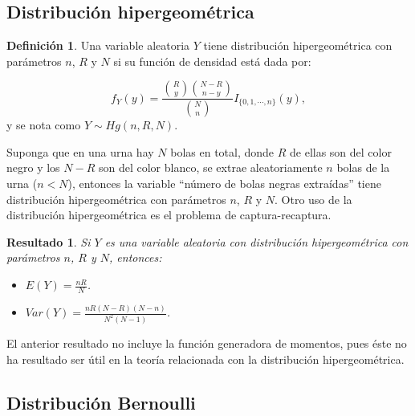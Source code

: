 \documentclass[
  spanish,
]{book}
\providecommand{\tightlist}{%
  \setlength{\itemsep}{0pt}\setlength{\parskip}{0pt}}
\newtheorem{proposition}{Resultado}[chapter]
\theoremstyle{definition}
\newtheorem{definition}{Definición}[chapter]
\theoremstyle{definition}
\theoremstyle{definition}
\theoremstyle{definition}
\theoremstyle{remark}
\begin{document}
\hypertarget{distribuciuxf3n-hipergeomuxe9trica}{%
\subsection{Distribución hipergeométrica}\label{distribuciuxf3n-hipergeomuxe9trica}}

\begin{definition}
\protect\hypertarget{def:unnamed-chunk-3}{}{\label{def:unnamed-chunk-3} }Una variable aleatoria \(Y\) tiene distribución hipergeométrica con parámetros \(n\), \(R\) y \(N\) si su función de densidad está dada por:

\begin{equation}
f_Y(y)=\frac{\binom{R}{y}\binom{N-R}{n-y}}{\binom{N}{n}}I_{\{0,1,\cdots,n\}}(y),
\end{equation}
y se nota como \(Y\sim Hg(n,R,N)\).
\end{definition}

Suponga que en una urna hay \(N\) bolas en total, donde \(R\) de ellas son del color negro y los \(N-R\) son del color blanco, se extrae aleatoriamente
\(n\) bolas de la urna (\(n<N\)), entonces la variable ``número de bolas negras extraídas'' tiene distribución hipergeométrica con parámetros \(n\), \(R\) y
\(N\). Otro uso de la distribución hipergeométrica es el problema de captura-recaptura.

\begin{proposition}
\protect\hypertarget{prp:unnamed-chunk-4}{}{\label{prp:unnamed-chunk-4} }Si \(Y\) es una variable aleatoria con distribución hipergeométrica con parámetros \(n\), \(R\) y \(N\), entonces:

\begin{itemize}
\tightlist
\item
  \(E(Y)=\frac{nR}{N}\).
\item
  \(Var(Y)=\frac{nR(N-R)(N-n)}{N^2(N-1)}\).
\end{itemize}
\end{proposition}

El anterior resultado no incluye la función generadora de momentos, pues éste no ha resultado ser útil en la teoría relacionada con la distribución hipergeométrica.

\hypertarget{distribuciuxf3n-bernoulli}{%
\subsection{Distribución Bernoulli}\label{distribuciuxf3n-bernoulli}}
\end{document}
